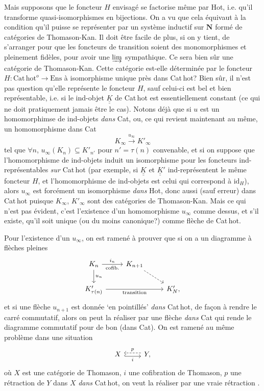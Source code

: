 \documentclass[11pt]{article}
\newcommand{\printedpage}[1]{\marginpar{\footnotesize p.~#1}}
\newcommand{\msp}[1]{\marginpar{\footnotesize [#1]}}
\newcommand{\Cathot}{\mathrm{Cat\,hot}}
\newcommand{\Ens}{\mathrm{Ens}}
\newcommand{\uuK}{\underline{\underline{K}}}
\begin{document}
Mais supposons que le foncteur $H$ envisagé se factorise même par Hot, i.e. qu'il transforme quasi-isomorphismes en bijections. On a vu que cela équivaut à la condition qu'il puisse se représenter par un système inductif sur $\mathbf{N}$ formé de catégories de Thomason-Kan. Il doit être facile de plus, si on y tient, de s'arranger pour que les foncteurs de transition soient des monomorphismes et pleinement fidèles, pour avoir une $\varinjlim$ sympathique. Ce sera bien sûr une catégorie de Thomason-Kan. Cette catégorie est-elle déterminée par le foncteur $H : \Cathot^{o} \longrightarrow \Ens$ à isomorphisme unique près dans Cat\,hot? Bien sûr, il n'est pas question qu'elle représente le foncteur $H$, sauf celui-ci est bel et bien représentable, i.e. si le ind-objet $\uuK$ de Cat\,hot est essentiellement constant (ce qui ne doit pratiquement jamais être le cas). Notons déjà
\printedpage{30}
\msp{page 47}
que si $u$ est un homomorphimse de ind-objets \textit{dans} Cat, ou, ce qui revient maintenant au même, un homomorphisme dans Cat %
\[
K_\infty \xrightarrow{u_\infty} K'_\infty
\]
tel que $\forall n$, $u_\infty(K_n) \subseteq K'_{n'}$ pour $n' = \tau(n)$ convenable, et si on suppose que l'homomorphisme de ind-objets induit un isomorphisme pour les foncteurs ind-représentables \textit{sur} Cat\,hot (par exemple, si $\uuK$ et $\uuK'$ ind-représentent le même foncteur $H$, et l'homomorphisme de ind-objets est celui qui correspond à $\mathrm{id}_H$), alors $u_\infty$ est forcément un isomorphisme \textit{dans} Hot, donc aussi (sauf erreur) dans Cat\,hot puisque $K_\infty$, $K'_\infty$ sont des catégories de Thomason-Kan. Mais ce qui n'est pas évident, c'est l'existence d'un homomorphisme $u_\infty$ comme dessus, et s'il existe, qu'il soit unique (ou du moins canonique?) comme flèche de Cat\,hot.

Pour l'existence d'un $u_\infty$, on est ramené à prouver que si on a un diagramme à flèches pleines
\[
\begin{tikzcd}
K_n \arrow[r, "i_n", "\text{cofib.}"'] \arrow[d, "u_n"] & K_{n+1} \arrow[dr, dashed] & \\
K'_{\tau(n)} \arrow[rr, "\text{transition}"'] & & K'_N ,
\end{tikzcd}
\]
et si une flèche $u_{n+1}$ est donnée `en pointillés' \textit{dans} Cat\,hot, de façon à rendre le carré commutatif,
\msp{page 48}
alors on peut la réaliser par une flèche \textit{dans} Cat qui rende le diagramme commutatif pour de bon (dans Cat). On est ramené au même problème dans une situation
\[
\begin{tikzcd}
X \arrow[r, hook, shift right, "i"'] & Y , \arrow[l, dashed, shift right, "p"']
\end{tikzcd}
\]
où $X$ est une catégorie de Thomason, $i$ une cofibration de Thomason, $p$ une rétraction de $Y$ dans $X$ \textit{dans} Cat\,hot, on veut la réaliser par une vraie rétraction .
\end{document}
